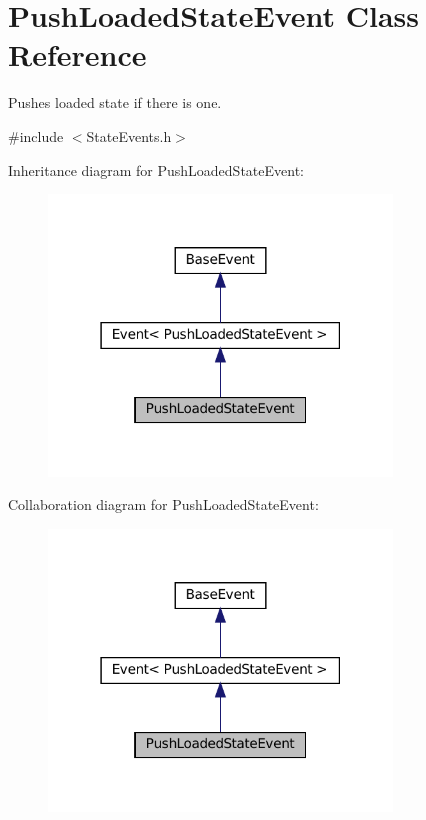 \hypertarget{classPushLoadedStateEvent}{}\section{Push\+Loaded\+State\+Event Class Reference}
\label{classPushLoadedStateEvent}


Pushes loaded state if there is one.  




{\ttfamily \#include $<$State\+Events.\+h$>$}



Inheritance diagram for Push\+Loaded\+State\+Event\+:
\nopagebreak
\begin{figure}[H]
\begin{center}
\leavevmode
\includegraphics[width=259pt]{classPushLoadedStateEvent__inherit__graph}
\end{center}
\end{figure}


Collaboration diagram for Push\+Loaded\+State\+Event\+:
\nopagebreak
\begin{figure}[H]
\begin{center}
\leavevmode
\includegraphics[width=259pt]{classPushLoadedStateEvent__coll__graph}
\end{center}
\end{figure}
